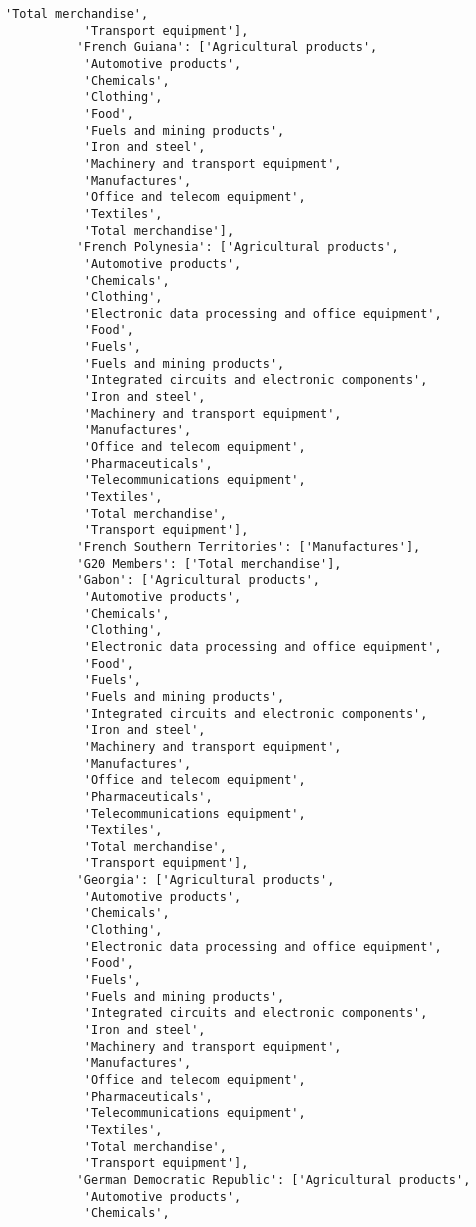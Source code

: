 \documentclass[11pt]{article}
\begin{document}
\begin{Verbatim}[commandchars=\\\{\}]
           'Total merchandise',
           'Transport equipment'],
          'French Guiana': ['Agricultural products',
           'Automotive products',
           'Chemicals',
           'Clothing',
           'Food',
           'Fuels and mining products',
           'Iron and steel',
           'Machinery and transport equipment',
           'Manufactures',
           'Office and telecom equipment',
           'Textiles',
           'Total merchandise'],
          'French Polynesia': ['Agricultural products',
           'Automotive products',
           'Chemicals',
           'Clothing',
           'Electronic data processing and office equipment',
           'Food',
           'Fuels',
           'Fuels and mining products',
           'Integrated circuits and electronic components',
           'Iron and steel',
           'Machinery and transport equipment',
           'Manufactures',
           'Office and telecom equipment',
           'Pharmaceuticals',
           'Telecommunications equipment',
           'Textiles',
           'Total merchandise',
           'Transport equipment'],
          'French Southern Territories': ['Manufactures'],
          'G20 Members': ['Total merchandise'],
          'Gabon': ['Agricultural products',
           'Automotive products',
           'Chemicals',
           'Clothing',
           'Electronic data processing and office equipment',
           'Food',
           'Fuels',
           'Fuels and mining products',
           'Integrated circuits and electronic components',
           'Iron and steel',
           'Machinery and transport equipment',
           'Manufactures',
           'Office and telecom equipment',
           'Pharmaceuticals',
           'Telecommunications equipment',
           'Textiles',
           'Total merchandise',
           'Transport equipment'],
          'Georgia': ['Agricultural products',
           'Automotive products',
           'Chemicals',
           'Clothing',
           'Electronic data processing and office equipment',
           'Food',
           'Fuels',
           'Fuels and mining products',
           'Integrated circuits and electronic components',
           'Iron and steel',
           'Machinery and transport equipment',
           'Manufactures',
           'Office and telecom equipment',
           'Pharmaceuticals',
           'Telecommunications equipment',
           'Textiles',
           'Total merchandise',
           'Transport equipment'],
          'German Democratic Republic': ['Agricultural products',
           'Automotive products',
           'Chemicals',

\end{Verbatim}
\end{document}
